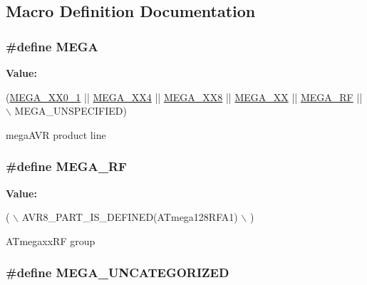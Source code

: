 \subsection{Macro Definition Documentation}
\hypertarget{group__mega__part__macros__group_ga78a6115b485de47c7cc56b224c558ea2}{
\subsubsection[{M\-E\-G\-A}]{\setlength{\rightskip}{0pt plus 5cm}\#define M\-E\-G\-A}}\label{group__mega__part__macros__group_ga78a6115b485de47c7cc56b224c558ea2}
{\bfseries Value\-:}
\begin{DoxyCode}
(\hyperlink{group__mega__part__macros__group_ga59ba73abcf65d3d398e7d37d78c271fe}{MEGA\_XX0\_1} || \hyperlink{group__mega__part__macros__group_gadcf5297df4d3d2f2bb5ccd7d6e3578b6}{MEGA\_XX4} || \hyperlink{group__mega__part__macros__group_ga47583caa82990781cd23a8495710ef31}{MEGA\_XX8} || \hyperlink{group__mega__part__macros__group_gabdf992a84b61d19055315a473c2e0f20}{MEGA\_XX} || 
      \hyperlink{group__mega__part__macros__group_ga1d762b037d9532cdfbc28404113aa480}{MEGA\_RF} || \(\backslash\)
    MEGA\_UNSPECIFIED)
\end{DoxyCode}
mega\-A\-V\-R product line \hypertarget{group__mega__part__macros__group_ga1d762b037d9532cdfbc28404113aa480}{
\subsubsection[{M\-E\-G\-A\-\_\-\-R\-F}]{\setlength{\rightskip}{0pt plus 5cm}\#define M\-E\-G\-A\-\_\-\-R\-F}}\label{group__mega__part__macros__group_ga1d762b037d9532cdfbc28404113aa480}
{\bfseries Value\-:}
\begin{DoxyCode}
( \(\backslash\)
        AVR8\_PART\_IS\_DEFINED(ATmega128RFA1) \(\backslash\)
        )
\end{DoxyCode}
A\-Tmegaxx\-R\-F group \hypertarget{group__mega__part__macros__group_ga9252d02a9216d5e9bf94000667ad6cb1}{
\subsubsection[{M\-E\-G\-A\-\_\-\-U\-N\-C\-A\-T\-E\-G\-O\-R\-I\-Z\-E\-D}]{\setlength{\rightskip}{0pt plus 5cm}\#define M\-E\-G\-A\-\_\-\-U\-N\-C\-A\-T\-E\-G\-O\-R\-I\-Z\-E\-D}}\label{group__mega__part__macros__group_ga9252d02a9216d5e9bf94000667ad6cb1}
